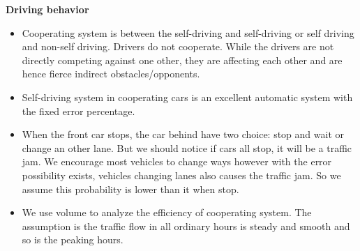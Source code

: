 \documentclass{mcmthesis}
\numberwithin{equation}{section}
\begin{document}
		\textbf{Driving behavior}
			\begin{itemize}
				\item Cooperating system is between the self-driving and self-driving or self driving and non-self driving. Drivers do not cooperate. While the drivers are not directly competing against one other, they are affecting each other and are hence fierce indirect obstacles/opponents.

				\item Self-driving system in cooperating cars is an excellent automatic system with the fixed error percentage.

				\item When the front car stops, the car behind have two choice: stop and wait or change an other lane. But we should notice if cars all stop, it will be a traffic jam. We encourage most vehicles to change ways however with the error possibility exists, vehicles changing lanes also causes the traffic jam. So we assume this probability is lower than it when stop.

				\item We use volume to analyze the efficiency of cooperating system. The assumption is the traffic flow in all ordinary hours is steady and smooth and so is the peaking hours.
			\end{itemize}
\end{document}
